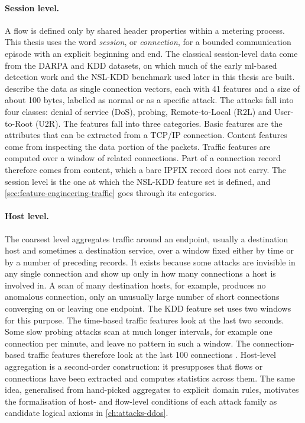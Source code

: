 \paragraph{Session level.}
A flow is defined only by shared header properties within a metering
process. This thesis uses the word \emph{session}, or \emph{connection}, for
a bounded communication episode with an explicit beginning and end. The
classical session-level data come from the DARPA and KDD datasets, on which
much of the early \gls{ml}-based detection work and the NSL-KDD benchmark
used later in this thesis are built. \citet{tavallaee2009kddcup99} describe
the data as single connection vectors, each with 41 features and a size of
about 100 bytes, labelled as normal or as a specific attack. The attacks
fall into four classes: denial of service (DoS), probing, Remote-to-Local
(R2L) and User-to-Root (U2R). The features fall into three categories. Basic
features are the attributes that can be extracted from a TCP/IP connection.
Content features come from
inspecting the data portion of the packets. Traffic features are computed
over a window of related connections. Part of a connection record therefore
comes from content, which a bare IPFIX record does not carry. The session
level is the one at which the NSL-KDD feature set is defined, and
\cref{sec:feature-engineering-traffic} goes through its categories.

\paragraph{Host level.}
The coarsest level aggregates traffic around an endpoint, usually a
destination host and sometimes a destination service, over a window fixed
either by time or by a number of preceding records. It exists because some
attacks are invisible in any single connection and show up only in how many
connections a host is involved in. A scan of many destination hosts, for
example, produces no anomalous connection, only an unusually large number of
short connections converging on or leaving one endpoint. The KDD feature set
uses two windows for this purpose. The time-based traffic features look at
the last two seconds. Some slow probing attacks scan at much longer
intervals, for example one connection per minute, and leave no pattern in
such a window. The connection-based traffic features therefore look at the
last 100 connections \citep{tavallaee2009kddcup99}. Host-level aggregation is a second-order construction: it presupposes
that flows or connections have been extracted and computes statistics across
them. The same idea, generalised from hand-picked aggregates to explicit
domain rules, motivates the formalisation of host- and flow-level conditions
of each attack family as candidate logical axioms in
\cref{ch:attacks-ddos}.

